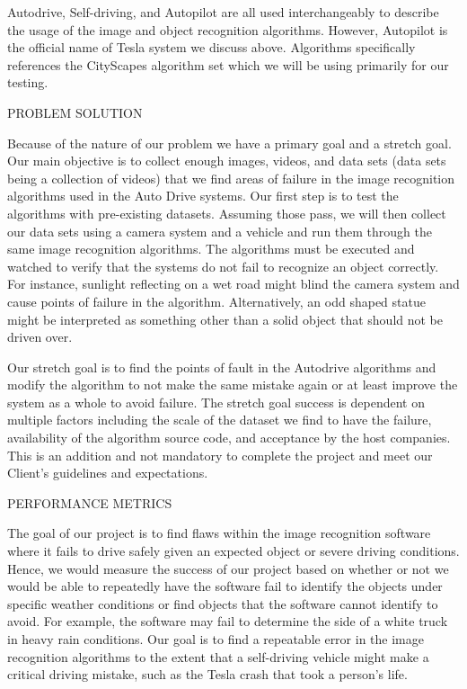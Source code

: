 \documentclass[letterpaper,10pt]{article}
\begin{document}
Autodrive, Self-driving, and Autopilot are all used interchangeably to describe the usage of the image and object recognition algorithms. However, Autopilot is the official name of Tesla system we discuss above. Algorithms specifically references the CityScapes algorithm set which we will be using primarily for our testing.\newline


\textsc{\large PROBLEM SOLUTION}

Because of the nature of our problem we have a primary goal and a stretch goal. Our main objective is to collect enough images, videos, and data sets (data sets being a collection of videos) that we find areas of failure in the image recognition algorithms used in the Auto Drive systems. Our first step is to test the algorithms with pre-existing datasets. Assuming those pass, we will then collect our data sets using a camera system and a vehicle and run them through the same image recognition algorithms. The algorithms must be executed and watched to verify that the systems do not fail to recognize an object correctly. For instance, sunlight reflecting on a wet road might blind the camera system and cause points of failure in the algorithm. Alternatively, an odd shaped statue might be interpreted as something other than a solid object that should not be driven over. 

Our stretch goal is to find the points of fault in the Autodrive algorithms and modify the algorithm to not make the same mistake again or at least improve the system as a whole to avoid failure. The stretch goal success is dependent on multiple factors including the scale of the dataset we find to have the failure, availability of the algorithm source code, and acceptance by the host companies. This is an addition and not mandatory to complete the project and meet our Client’s guidelines and expectations.\newline


\textsc{\large PERFORMANCE METRICS}

The goal of our project is to find flaws within the image recognition software where it fails to drive safely given an expected object or severe driving conditions. Hence, we would measure the success of our project based on whether or not we would be able to repeatedly have the software fail to identify the objects under specific weather conditions or find objects that the software cannot identify to avoid. For example, the software may fail to determine the side of a white truck in heavy rain conditions. Our goal is to find a repeatable error in the image recognition algorithms to the extent that a self-driving vehicle might make a critical driving mistake, such as the Tesla crash that took a person's life.
\end{document}
